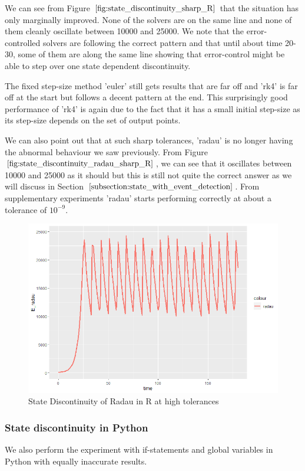We can see from Figure $\ref{fig:state_discontinuity_sharp_R}$ that the situation has only marginally improved. None of the solvers are on the same line and none of them cleanly oscillate between 10000 and 25000. We note that the error-controlled solvers are following the correct pattern and that until about time 20-30, some of them are along the same line showing that error-control might be able to step over one state dependent discontinuity.

The fixed step-size method 'euler' still gets results that are far off and 'rk4' is far off at the start but follows a decent pattern at the end. This surprisingly good performance of 'rk4' is again due to the fact that it has a small initial step-size as its step-size depends on the set of output points.

We can also point out that at such sharp tolerances, 'radau' is no longer having the abnormal behaviour we saw previously. From Figure $\ref{fig:state_discontinuity_radau_sharp_R}$, we can see that it oscillates between 10000 and 25000 as it should but this is still not quite the correct answer as we will discuss in Section $\ref{subsection:state_with_event_detection}$. From supplementary experiments 'radau' starts performing correctly at about a tolerance of $10^{-9}$.

\begin{figure}[h]
	\centering
	\includegraphics[width=0.7\linewidth]{./figures/state_discontinuity_sharp_radau_R}
	\caption{State Discontinuity of Radau in R at high tolerances}
	\label{fig:state_discontinuity_radau_sharp_R}
\end{figure}

\subsubsection{State discontinuity in Python}
We also perform the experiment with if-statements and global variables in Python with equally inaccurate results.

